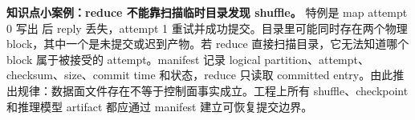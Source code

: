 \begin{casebox}
\textbf{知识点小案例：reduce 不能靠扫描临时目录发现 shuffle。}
特例是 map attempt 0 写出  后 reply 丢失，attempt 1 重试并成功提交。目录里可能同时存在两个物理 block，其中一个是未提交或迟到产物。若 reduce 直接扫描目录，它无法知道哪个 block 属于被接受的 attempt。manifest 记录 logical partition、attempt、checksum、size、commit time 和状态，reduce 只读取 committed entry。由此推出规律：数据面文件存在不等于控制面事实成立。工程上所有 shuffle、checkpoint 和推理模型 artifact 都应通过 manifest 建立可恢复提交边界。
\end{casebox}
